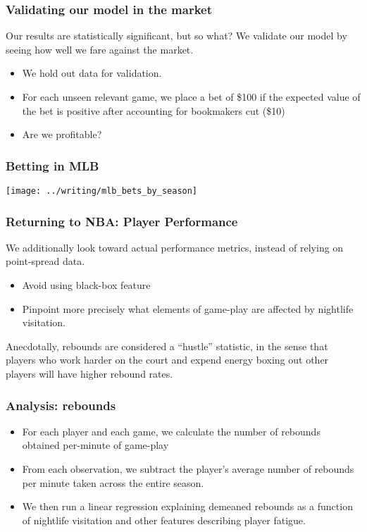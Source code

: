 \documentclass{beamer}
\begin{document}
\begin{frame}   \frametitle{Validating our model in the market}
  Our results are statistically significant, but so what? We validate our model by seeing
  how well we fare against the market.

  \begin{itemize}     \item We hold out data for validation.
    \item For each unseen relevant game, we place a bet of \$100 if the expected value of the bet
      is positive after accounting for bookmakers cut (\$10)
    \item Are we profitable?
  \end{itemize} \end{frame}

\begin{frame}   \frametitle{Betting in MLB}
  \centering
  \texttt{[image: ../writing/mlb\_bets\_by\_season]} \end{frame}

\begin{frame}   \frametitle{Returning to NBA: Player Performance}
  We additionally look toward actual performance metrics, instead of relying on point-spread data.
  
  \vspace{12pt}
  \begin{itemize}     
    \item Avoid using black-box feature
    \item Pinpoint more precisely what elements of game-play are affected by nightlife visitation.   
\end{itemize}

\vspace{12pt}  Anecdotally, rebounds are considered a ``hustle'' statistic, in the sense that players
  who work harder on the court and expend energy boxing out other players will have higher
  rebound rates. \end{frame}

\begin{frame}   \frametitle{Analysis: rebounds}
  \begin{itemize}     \item For each player and each game, we calculate the number of rebounds obtained per-minute of game-play
    \item From each observation, we subtract the player's average number of rebounds per minute taken across the entire season.
    \item We then run a linear regression explaining demeaned rebounds as a function of 
      nightlife visitation and other features describing player fatigue.   \end{itemize} \end{frame}
\end{document}
